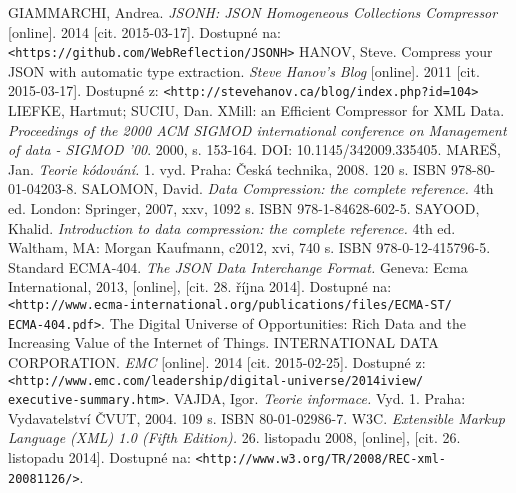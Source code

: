 \begin{thebibliography}{99}
 GIAMMARCHI, Andrea. {\em JSONH: JSON Homogeneous Collections Compressor} [online]. 2014 [cit. 2015-03-17]. Dostupné na: {\tt <https://github.com/WebReflection/JSONH>}
 HANOV, Steve. Compress your JSON with automatic type extraction. {\em Steve Hanov's Blog} [online]. 2011 [cit. 2015-03-17]. Dostupné z: {\tt <http://stevehanov.ca/blog/index.php?id=104>}
 LIEFKE, Hartmut; SUCIU, Dan. XMill: an Efficient Compressor for XML Data. {\em Proceedings of the 2000 ACM SIGMOD international conference on Management of data - SIGMOD '00}. 2000, s. 153-164. DOI: 10.1145/342009.335405.
 MAREŠ, Jan. {\em Teorie kódování.} 1. vyd. Praha: Česká technika, 2008. 120 s. ISBN 978-80-01-04203-8.
 SALOMON, David. {\em Data Compression: the complete reference.} 4th ed. London: Springer, 2007, xxv, 1092 s. ISBN 978-1-84628-602-5.
	SAYOOD, Khalid. {\em Introduction to data compression: the complete reference.} 4th ed. Waltham, MA: Morgan Kaufmann, c2012, xvi, 740 s. ISBN 978-0-12-415796-5.
 Standard ECMA-404. {\em The JSON Data Interchange Format.} Geneva: Ecma International, 2013, [online], [cit. 28. října 2014]. Dostupné na: {\tt <http://www.ecma-international.org/publications/files/ECMA-ST/\\ECMA-404.pdf>}.
 The Digital Universe of Opportunities: Rich Data and the Increasing Value of the Internet of Things. INTERNATIONAL DATA CORPORATION. {\em EMC} [online]. 2014 [cit. 2015-02-25]. Dostupné z: {\tt <http://www.emc.com/leadership/digital-universe/2014iview/\\executive-summary.htm>}.
 VAJDA, Igor. {\em Teorie informace.} Vyd. 1. Praha: Vydavatelství ČVUT, 2004. 109 s. ISBN 80-01-02986-7.
 W3C. {\em Extensible Markup Language (XML) 1.0 (Fifth Edition).} 26. listopadu 2008, [online], [cit. 26. listopadu 2014]. Dostupné na: {\tt <http://www.w3.org/TR/2008/REC-xml-20081126/>}.
\end{thebibliography}
